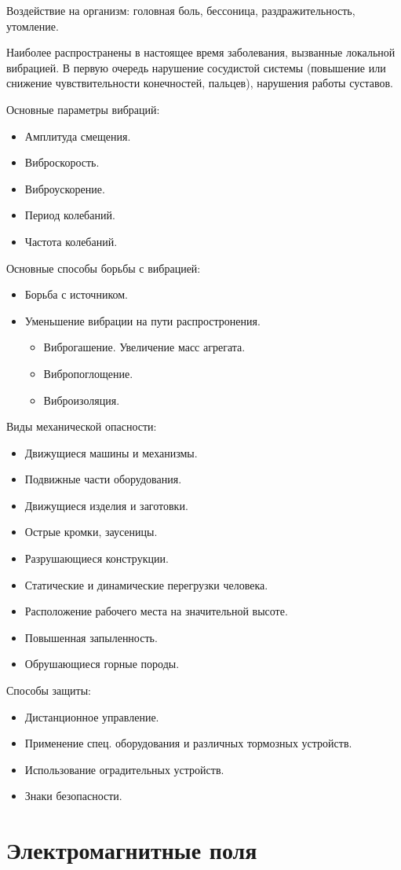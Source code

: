 Воздействие на организм: головная боль, бессоница, раздражительность, утомление. 

Наиболее распространены в настоящее время заболевания, вызванные локальной вибрацией. В первую очередь нарушение сосудистой системы (повышение или снижение чувствительности конечностей, пальцев), нарушения работы суставов.

Основные параметры вибраций:
\begin{itemize}
	\item Амплитуда смещения.
	\item Виброскорость.
	\item Виброускорение.
	\item Период колебаний.
	\item Частота колебаний.
\end{itemize}

Основные способы борьбы с вибрацией:
\begin{itemize}
	\item Борьба с источником.
	\item Уменьшение вибрации на пути распростронения.
	\begin{itemize}
		\item Виброгашение. Увеличение масс агрегата.
		\item Вибропоглощение.
		\item Виброизоляция.
	\end{itemize}
\end{itemize}

Виды механической опасности:
\begin{itemize}
	\item Движущиеся машины и механизмы.
	\item Подвижные части оборудования.
	\item Движущиеся изделия и заготовки.
	\item Острые кромки, заусеницы.
	\item Разрушающиеся конструкции.
	\item Статические и динамические перегрузки человека.
	\item Расположение рабочего места на значительной высоте.
	\item Повышенная запыленность.
	\item Обрушающиеся горные породы.
\end{itemize}

Способы защиты:
\begin{itemize}
	\item Дистанционное управление.
	\item Применение спец. оборудования и различных тормозных устройств.
	\item Использование оградительных устройств.
	\item Знаки безопасности.
\end{itemize}

\section{Электромагнитные поля}
